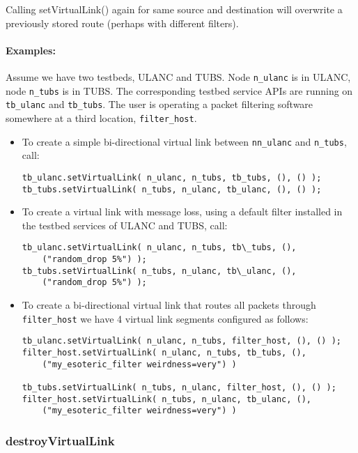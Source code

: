Calling setVirtualLink() again for same source and destination will overwrite a previously stored route (perhaps with different filters).

\paragraph{Examples:} 
Assume we have two testbeds, ULANC and TUBS. Node {\tt n\_ulanc} is in ULANC, node {\tt n\_tubs} is in TUBS. The corresponding testbed service APIs are running on {\tt tb\_ulanc} and {\tt tb\_tubs}. The user is operating a packet filtering software somewhere at a third location, {\tt filter\_host}.

\begin{itemize}
	\item To create a simple bi-directional virtual link between {\tt nn\_ulanc} and {\tt n\_tubs}, call:
		\begin{lstlisting}
tb_ulanc.setVirtualLink( n_ulanc, n_tubs, tb_tubs, (), () );
tb_tubs.setVirtualLink( n_tubs, n_ulanc, tb_ulanc, (), () );
\end{lstlisting}

\item To create a virtual link with message loss, using a default filter installed in the testbed services of ULANC and TUBS, call:
  \begin{lstlisting}
tb_ulanc.setVirtualLink( n_ulanc, n_tubs, tb\_tubs, (),
	("random_drop 5%") );
tb_tubs.setVirtualLink( n_tubs, n_ulanc, tb\_ulanc, (), 
	("random_drop 5%") );
\end{lstlisting}

\item To create a bi-directional virtual link that routes all packets through {\tt filter\_host} we have 4 virtual link segments configured as follows: 
  \begin{lstlisting}
tb_ulanc.setVirtualLink( n_ulanc, n_tubs, filter_host, (), () );
filter_host.setVirtualLink( n_ulanc, n_tubs, tb_tubs, (),
	("my_esoteric_filter weirdness=very") )

tb_tubs.setVirtualLink( n_tubs, n_ulanc, filter_host, (), () );
filter_host.setVirtualLink( n_tubs, n_ulanc, tb_ulanc, (),
	("my_esoteric_filter weirdness=very") )
\end{lstlisting}
\end{itemize}


			\subsubsection{destroyVirtualLink}

